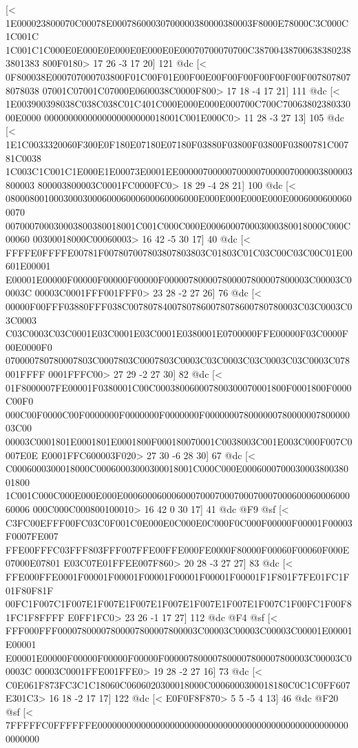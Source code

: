 {{{{{{{[<
1E000023800070C00078E00078600030700000380000380003F8000E78000C3C000C1C001C
1C001C1C000E0E000E0E000E0E000E0E00070700070700C387004387006383802383801383
800F0180>
	 17 26 -3 17 20] 121 @dc
[<
0F800038E000707000703800F01C00F01E00F00E00F00F00F00F00F00F0078078078078038
07001C07001C07000E0600038C0000F800>
	 17 18 -4 17 21] 111 @dc
[<
1E003900398038C038C038C01C401C000E000E000E000700C700C7006380238033000E0000
0000000000000000000000018001C001E000C0>
	 11 28 -3 27 13] 105 @dc
[<
1E1C0033320060F300E0F180E07180E07180F03880F03800F03800F03800781C00781C0038
1C003C1C001C1E000E1E00073E0001EE000007000007000007000007000003800003800003
800003800003C0001FC0000FC0>
	 18 29 -4 28 21] 100 @dc
[<
0800080010003000300060006000600060006000E000E000E000E000E00060006000600070
007000700030003800380018001C001C000C000E000600070003000380018000C000C00060
00300018000C00060003>
	 16 42 -5 30 17] 40 @dc
[<
FFFFE0FFFFE00781F007807007803807803803C01803C01C03C00C03C00C01E00601E00001
E00001E00000F00000F00000F00000F000007800007800007800007800003C00003C00003C
00003C0001FFF001FFF0>
	 23 28 -2 27 26] 76 @dc
[<
00000F00FFF03880FFF038C00780784007807860078078600780780003C03C0003C03C0003
C03C0003C03C0001E03C0001E03C0001E0380001E0700000FFE00000F03C0000F00E0000F0
070000780780007803C0007803C0007803C0003C03C0003C03C0003C03C0003C078001FFFF
0001FFFC00>
	 27 29 -2 27 30] 82 @dc
[<
01F8000007FE00001F0380001C00C000380060007800300070001800F0001800F0000C00F0
000C00F0000C00F0000000F0000000F0000000F00000007800000078000000780000003C00
00003C0001801E0001801E0001800F000180070001C0038003C001E003C000F007C0007E0E
E0001FFC600003F020>
	 27 30 -6 28 30] 67 @dc
[<
C0006000300018000C00060003000300018001C000C000E000600070003000380038001800
1C001C000C000E000E000E0006000600060007000700070007000700060006000600060006
000C000C000800100010>
	 16 42 0 30 17] 41 @dc
@F9 @sf
[<
C3FC00EFFF00FC03C0F001C0E000E0C000E0C000F0C000F00000F00001F00003F0007FE007
FFE00FFFC03FFF803FFF007FFE00FFE000FE0000F80000F00060F00060F000E07000E07801
E03C07E01FFEE007F860>
	 20 28 -3 27 27] 83 @dc
[<
FFE000FFE0001F00001F00001F00001F00001F00001F00001F1F801F7FE01FC1F01F80F81F
00FC1F007C1F007E1F007E1F007E1F007E1F007E1F007E1F007C1F00FC1F00F81FC1F8FFFF
E0FF1FC0>
	 23 26 -1 17 27] 112 @dc
@F4 @sf
[<
FFF000FFF00007800007800007800007800003C00003C00003C00003C00001E00001E00001
E00001E00000F00000F00000F00000F000007800007800007800007800003C00003C00003C
00003C0001FFE001FFE0>
	 19 28 -2 27 16] 73 @dc
[<
C0E061F873FC3C1C18060C0606020300018000C0006000300018180C0C1C0FF607E301C3>
	 16 18 -2 17 17] 122 @dc
[<
E0F0F8F870>
	 5 5 -5 4 13] 46 @dc
@F20 @sf
[<
7FFFFFC0FFFFFFE00000000000000000000000000000000000000000000000000000000000
}}}}}}}
